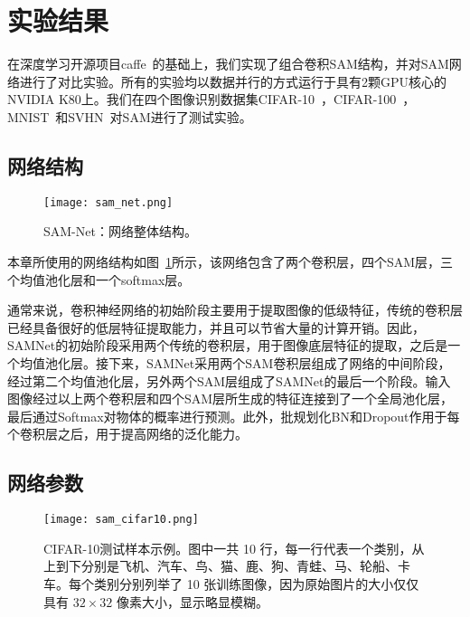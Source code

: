 \section{实验结果}
\label{sec:sap:experiment}

在深度学习开源项目caffe~\cite{jia2014caffe}的基础上，我们实现了组合卷积SAM结构，并对SAM网络进行了对比实验。所有的实验均以数据并行的方式运行于具有2颗GPU核心的NVIDIA K80上。我们在四个图像识别数据集CIFAR-10~\cite{krizhevsky2009learning}，CIFAR-100~\cite{krizhevsky2009learning}，MNIST~\cite{lecun1998gradient}和SVHN~\cite{netzer2011reading}对SAM进行了测试实验。

\subsection{网络结构}
\label{sec:sap:experiment:arc}

\begin{figure}[t]
\centering
\texttt{[image: sam\_net.png]}
\caption{SAM-Net：网络整体结构。}
\label{fig:net}
\end{figure}

本章所使用的网络结构如图~\ref{fig:net}所示，该网络包含了两个卷积层，四个SAM层，三个均值池化层和一个softmax层。

通常来说，卷积神经网络的初始阶段主要用于提取图像的低级特征，传统的卷积层已经具备很好的低层特征提取能力，并且可以节省大量的计算开销。因此，SAMNet的初始阶段采用两个传统的卷积层，用于图像底层特征的提取，之后是一个均值池化层。接下来，SAMNet采用两个SAM卷积层组成了网络的中间阶段，经过第二个均值池化层，另外两个SAM层组成了SAMNet的最后一个阶段。输入图像经过以上两个卷积层和四个SAM层所生成的特征连接到了一个全局池化层，最后通过Softmax对物体的概率进行预测。此外，批规划化BN和Dropout作用于每个卷积层之后，用于提高网络的泛化能力。

\subsection{网络参数}
\label{sec:sap:experiment:param}

\begin{figure}[!h]
\centering
\texttt{[image: sam\_cifar10.png]}
\caption{CIFAR-10测试样本示例。图中一共 10 行，每一行代表一个类别，从上到下分别是飞机、汽车、鸟、猫、鹿、狗、青蛙、马、轮船、卡车。每个类别分别列举了 10 张训练图像，因为原始图片的大小仅仅具有 $32\times32$ 像素大小，显示略显模糊。}
\label{fig:sam_cifar10}
\end{figure}


